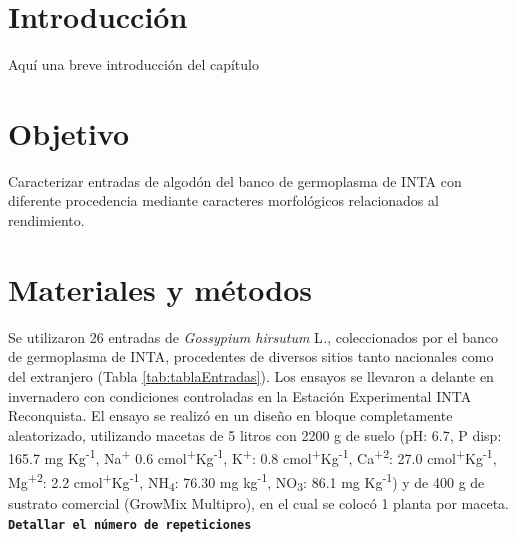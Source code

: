 \documentclass[12pt,oneside]{reedthesis}
\begin{document}
\section{Introducción}\label{introducciuxf3n-1}

Aquí una breve introducción del capítulo\\

\section{Objetivo}\label{objetivo}

Caracterizar entradas de algodón del banco de germoplasma de INTA con diferente procedencia mediante caracteres morfológicos relacionados al rendimiento.

\section{Materiales y métodos}\label{materiales-y-muxe9todos}

Se utilizaron 26 entradas de \emph{Gossypium hirsutum} L\emph{.}, coleccionados por el banco de germoplasma de INTA, procedentes de diversos sitios tanto nacionales como del extranjero (Tabla \ref{tab:tablaEntradas}). Los ensayos se llevaron a delante en invernadero con condiciones controladas en la Estación Experimental INTA Reconquista. El ensayo se realizó en un diseño en bloque completamente aleatorizado, utilizando macetas de 5 litros con 2200 g de suelo (pH: 6.7, P disp: 165.7 mg Kg\textsuperscript{-1}, Na\textsuperscript{+} 0.6 cmol\textsuperscript{+}Kg\textsuperscript{-1}, K\textsuperscript{+}: 0.8 cmol\textsuperscript{+}Kg\textsuperscript{-1}, Ca\textsuperscript{+2}: 27.0 cmol\textsuperscript{+}Kg\textsuperscript{-1}, Mg\textsuperscript{+2}: 2.2 cmol\textsuperscript{+}Kg\textsuperscript{-1}, NH\textsubscript{4}: 76.30 mg kg\textsuperscript{-1}, NO\textsubscript{3}: 86.1 mg Kg\textsuperscript{-1}) y de 400 g de sustrato comercial (GrowMix Multipro), en el cual se colocó 1 planta por maceta. \textbf{\texttt{Detallar\ el\ número\ de\ repeticiones}}
\end{document}

